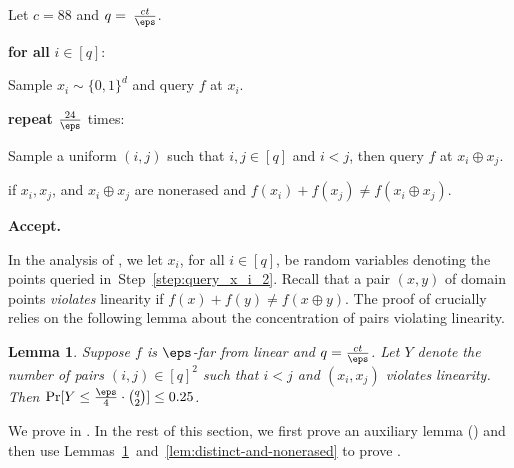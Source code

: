\documentclass[11pt]{article}
\numberwithin{equation}{section}
\newtheorem{lemma}[theorem]{Lemma}
\theoremstyle{definition}
\theoremstyle{plain}
\begin{document}
\begin{algorithm} %
	\caption{An Online-Erasure-Resilient Linearity Tester}
	\begin{algorithmic}[1]
		
		\State Let $c = 88$ and $q = \:\frac{ct}{\eps}$. 
		
		\State\textbf{for all} {$i \in [q]$}:\label{step:loop_query_x_i_2}

		\State  \indent Sample $x_i \sim \{0,1\}^d$ and query $f$ at $x_i$. \label{step:query_x_i_2}
		
		\State\textbf{repeat} $\frac{24}{\eps}$ times:\label{step:query_sum}
		
		\State  \indent Sample a uniform $(i, j)$ such that $i,j\in[q]$ and $i <j$, then  query $f$ at $x_i \oplus x_j$.\label{step:sample-ij}
		
		\State  {} if $x_i, x_j$, and $x_i\oplus x_j$ are nonerased and $f(x_i) + f(x_j) \neq f(x_i\oplus x_j)$.\label{step:check_I}
		
	
		\State \textbf{Accept.}
	\end{algorithmic}
	\label{alg:linearity}
\end{algorithm}

In the analysis of , we let $x_i$, for all $i \in [q]$, be random variables denoting the points queried in~Step~\ref{step:query_x_i_2}. 
Recall that a pair $(x, y)$ of domain points  \emph{violates} linearity if $f(x) + f(y) \neq f(x \oplus y)$.
The proof of  crucially relies on the following lemma about the concentration of pairs violating linearity. %

\begin{lemma}\label{lem:violating_sums}
Suppose $f$ is $\eps$-far from linear and $q = \frac{ct}{\eps}$. Let $Y$ denote the number of pairs $(i,j) \in [q]^2$ such that $i < j$ and $(x_i,x_j)$ violates linearity. Then $\Pr[Y \leq \frac{\eps}{4}\cdot \binom{q}{2}]\leq 0.25$.  %
\end{lemma}



We prove  in . In the rest of this section, we first prove an auxiliary lemma () and then use Lemmas~\ref{lem:violating_sums}~and~\ref{lem:distinct-and-nonerased} to prove .
\end{document}
